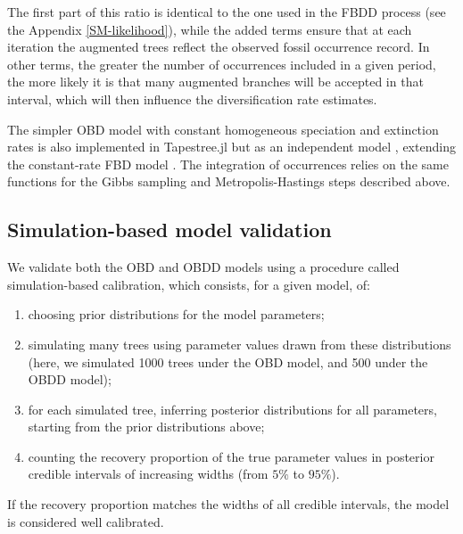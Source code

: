\documentclass[oupdraft]{sysbio}
\begin{document}
The first part of this ratio is identical to the one used in the FBDD process (see the Appendix \ref{SM-likelihood}), while the added terms ensure that at each iteration the augmented trees reflect the observed fossil occurrence record. In other terms, the greater the number of occurrences included in a given period, the more likely it is that many augmented branches will be accepted in that interval, which will then influence the diversification rate estimates.

The simpler OBD model with constant homogeneous speciation and extinction rates is also implemented in Tapestree.jl but as an independent model \citep{quintero_tapestreejl_2020}, extending the constant-rate FBD model \citep{quintero_rise_2025}. The integration of occurrences relies on the same functions for the Gibbs sampling and Metropolis-Hastings steps described above.

\subsection{Simulation-based model validation}

We validate both the OBD and OBDD models using a procedure called simulation-based calibration, which consists, for a given model, of:
\begin{enumerate}
    \item choosing prior distributions for the model parameters;
    \item simulating many trees using parameter values drawn from these distributions (here, we simulated 1000 trees under the OBD model, and 500 under the OBDD model);
    \item for each simulated tree, inferring posterior distributions for all parameters, starting from the prior distributions above;
    \item counting the recovery proportion of the true parameter values in posterior credible intervals of increasing widths (from $5\%$ to $95\%$).
\end{enumerate}
If the recovery proportion matches the widths of all credible intervals, the model is considered well calibrated.
\end{document}
